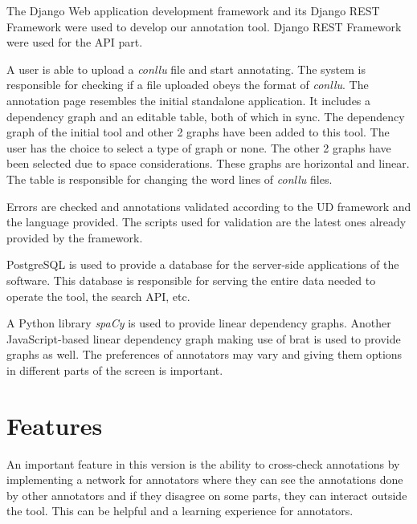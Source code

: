 \documentclass[
]{ceurart}
\begin{document}
The Django\cite{django} Web application development framework and its Django REST Framework\cite{drf} were used to develop our annotation tool.
Django REST Framework were used for the API part.

A user is able to upload a \textit{conllu} file and start annotating.
The system is responsible for checking if a file uploaded obeys the format of \textit{conllu}.
The annotation page resembles the initial standalone application.
It includes a dependency graph and an editable table, both of which in sync.
The dependency graph of the initial tool and other 2 graphs have been added to this tool.
The user has the choice to select a type of graph or none.
The other 2 graphs have been selected due to space considerations.
These graphs are horizontal and linear.
The table is responsible for changing the word lines of \textit{conllu} files.

Errors are checked and annotations validated according to the UD framework and the language provided.
The scripts used for validation are the latest ones already provided by the framework.\cite{UD-git}

PostgreSQL\cite{psql} is used to provide a database for the server-side applications of the software.
This database is responsible for serving the entire data needed to operate the tool, the search API, etc.

A Python library \textit{spaCy}\cite{spacy} is used to provide linear dependency graphs.
Another JavaScript-based linear dependency graph\cite{spyssalo} making use of brat\cite{brat-vis} is used to provide graphs as well.
The preferences of annotators may vary and giving them options in different parts of the screen is important.


\section{Features}

An important feature in this version is the ability to cross-check annotations by implementing a network for annotators where they can see the annotations done by other annotators and if they disagree on some parts, they can interact outside the tool.
This can be helpful and a learning experience for annotators.
\end{document}
